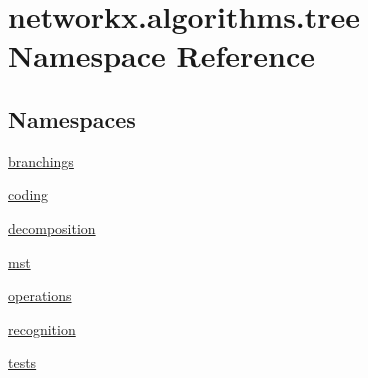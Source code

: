 \hypertarget{namespacenetworkx_1_1algorithms_1_1tree}{}\section{networkx.\+algorithms.\+tree Namespace Reference}
\label{namespacenetworkx_1_1algorithms_1_1tree}
\subsection*{Namespaces}
\begin{DoxyCompactItemize}
\item 
 \hyperlink{namespacenetworkx_1_1algorithms_1_1tree_1_1branchings}{branchings}
\item 
 \hyperlink{namespacenetworkx_1_1algorithms_1_1tree_1_1coding}{coding}
\item 
 \hyperlink{namespacenetworkx_1_1algorithms_1_1tree_1_1decomposition}{decomposition}
\item 
 \hyperlink{namespacenetworkx_1_1algorithms_1_1tree_1_1mst}{mst}
\item 
 \hyperlink{namespacenetworkx_1_1algorithms_1_1tree_1_1operations}{operations}
\item 
 \hyperlink{namespacenetworkx_1_1algorithms_1_1tree_1_1recognition}{recognition}
\item 
 \hyperlink{namespacenetworkx_1_1algorithms_1_1tree_1_1tests}{tests}
\end{DoxyCompactItemize}
